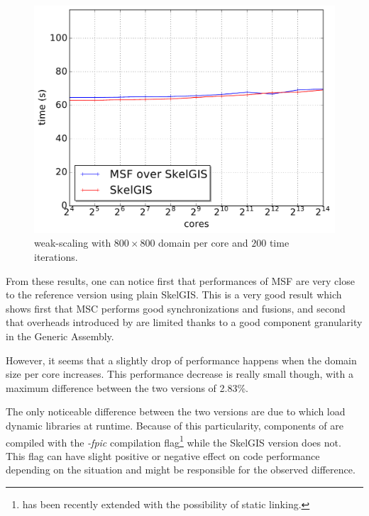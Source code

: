 \begin{figure}[t]
\begin{center}
  \includegraphics[width=.6\textwidth]{../results/weak_scaling/800_200/median_weak.pdf}
  \caption{weak-scaling with $800 \times 800$ domain per core and $200$ time iterations.}
  \label{fig:weak3}
 \end{center}
\end{figure}

From these results, one can notice first that performances of MSF are very close to the reference version using plain SkelGIS. This is a very good result which shows first that MSC performs good synchronizations and fusions, and second that overheads introduced by \llc are limited thanks to a good component granularity in the Generic Assembly.

However, it seems that a slightly drop of performance happens when the domain size per core increases. This performance decrease is really small though, with a maximum difference between the two versions of 2.83\%.

The only noticeable difference between the two versions are due to \llc which load dynamic libraries at runtime. Because of this particularity, components of \llc are compiled with the \emph{-fpic} compilation flag\footnote{\llc has been recently extended with the possibility of static linking.} while the SkelGIS version does not. This flag can have slight positive or negative effect on code performance depending on the situation and might be responsible for the observed difference.



